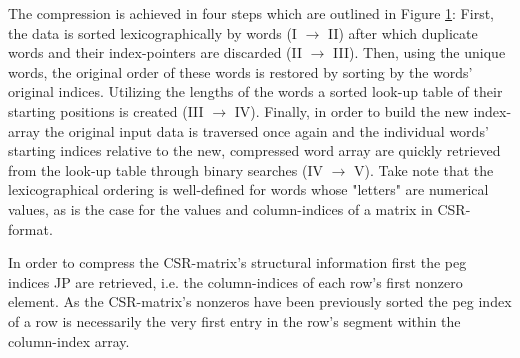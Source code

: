     The compression is achieved in four steps which are outlined in Figure \ref{fig:c3sr-compression-scheme}: First, the
    data is sorted lexicographically by words (I $\rightarrow$ II) after which duplicate words and their index-pointers
    are discarded (II $\rightarrow$ III). Then, using the unique words, the original order of these words is restored by
    sorting by the words' original indices. Utilizing the lengths of the words a sorted look-up table of their starting
    positions is created (III $\rightarrow$ IV). Finally, in order to build the new index-array the original input data
    is traversed once again and the individual words' starting indices relative to the new, compressed word array are
    quickly retrieved from the look-up table through binary searches (IV $\rightarrow$ V). Take note that the
    lexicographical ordering is well-defined for words whose "letters" are numerical values, as is the case for the
    values and column-indices of a matrix in CSR-format.

    \begin{figure}[H]
      \centering
      \captionsetup{width=0.9\columnwidth}
      
      \label{fig:c3sr-compression-scheme}
    \end{figure}

    In order to compress the CSR-matrix's structural information first the peg indices JP are retrieved, i.e. the
    column-indices of each row's first nonzero element. As the CSR-matrix's nonzeros have been previously sorted the peg
    index of a row is necessarily the very first entry in the row's segment within the column-index array.

